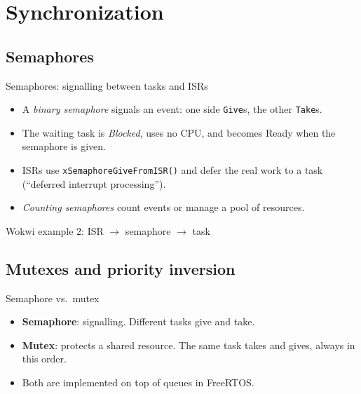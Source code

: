 \section{Synchronization}

\subsection{Semaphores}
\begin{frame}{Semaphores: signalling between tasks and ISRs}
  \begin{itemize}
    \item A \emph{binary semaphore} signals an event: one side \texttt{Give}s, the other \texttt{Take}s.
    \item The waiting task is \emph{Blocked}, uses no CPU, and becomes Ready when the semaphore is given.
    \item ISRs use \texttt{xSemaphoreGiveFromISR()} and defer the real work to a task (``deferred interrupt processing'').
    \item \emph{Counting semaphores} count events or manage a pool of resources.
  \end{itemize}
\end{frame}

\begin{frame}[fragile]{Wokwi example 2: ISR $\rightarrow$ semaphore $\rightarrow$ task}
\end{frame}


\subsection{Mutexes and priority inversion}
\begin{frame}{Semaphore vs.\ mutex}
  \begin{itemize}
    \item \textbf{Semaphore}: signalling. Different tasks give and take.
    \item \textbf{Mutex}: protects a shared resource. The same task takes and gives, always in this order.
    \item Both are implemented on top of queues in FreeRTOS.
  \end{itemize}
\end{frame}

